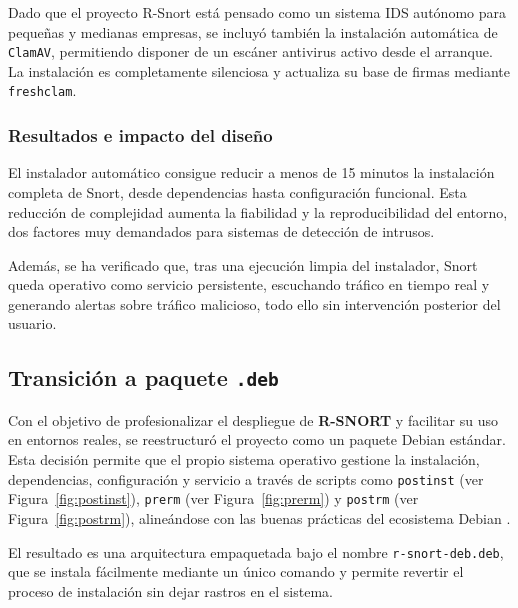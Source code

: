 \documentclass[11pt,a4paper,twoside]{report}
\begin{document}
Dado que el proyecto R-Snort está pensado como un sistema IDS autónomo para pequeñas y medianas empresas, se incluyó también la instalación automática de \texttt{ClamAV}, permitiendo disponer de un escáner antivirus activo desde el arranque. La instalación es completamente silenciosa y actualiza su base de firmas mediante \texttt{freshclam}.

\subsubsection{Resultados e impacto del diseño}

El instalador automático consigue reducir a menos de 15 minutos la instalación completa de Snort, desde dependencias hasta configuración funcional. Esta reducción de complejidad aumenta la fiabilidad y la reproducibilidad del entorno, dos factores muy demandados para sistemas de detección de intrusos.\newline

Además, se ha verificado que, tras una ejecución limpia del instalador, Snort queda operativo como servicio persistente, escuchando tráfico en tiempo real y generando alertas sobre tráfico malicioso, todo ello sin intervención posterior del usuario.

\pagebreak


\subsection{Transición a paquete \texttt{.deb}}

Con el objetivo de profesionalizar el despliegue de \textbf{R-SNORT} y facilitar su uso en entornos reales, se reestructuró el proyecto como un paquete Debian estándar. Esta decisión permite que el propio sistema operativo gestione la instalación, dependencias, configuración y servicio a través de scripts como \texttt{postinst} (ver Figura~\ref{fig:postinst}), \texttt{prerm} (ver Figura~\ref{fig:prerm}) y \texttt{postrm} (ver Figura~\ref{fig:postrm}), alineándose con las buenas prácticas del ecosistema Debian \cite{debian_packaging_guide}.
\newline

El resultado es una arquitectura empaquetada bajo el nombre \texttt{r-snort-deb.deb}, que se instala fácilmente mediante un único comando y permite revertir el proceso de instalación sin dejar rastros en el sistema.
\end{document}
